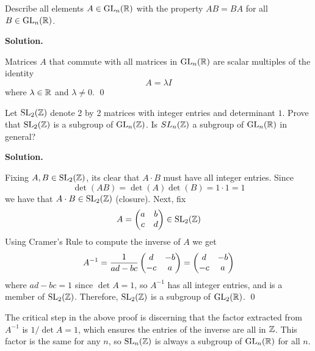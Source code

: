 \documentclass[12pt]{book}
\theoremstyle{definition}
\newenvironment{solution}
{%
  \par\noindent\textbf{Solution.}\quad
}
{%
  \qed\par
}
\begin{document}
\begin{taggedexercise}[\textcolor{yellow}{WIP}]
  Describe all elements $A \in \mathrm{GL}_{n}(\mathbb{R})$ with the property $AB=BA$ for all $B \in \mathrm{GL}_{n}(\mathbb{R})$.
\end{taggedexercise}

\begin{solution}
  Matrices $A$ that commute with all matrices in $\mathrm{GL}_{n}(\mathbb{R})$ are scalar multiples of the identity
  \[
  A = \lambda I
  \]
  where $\lambda \in \mathbb{R}$ and $\lambda \neq 0$.
\end{solution}

\begin{taggedexercise}[\textcolor{green}{Complete}]
  Let $\mathrm{SL}_{2}(\mathbb{Z})$ denote 2 by 2 matrices with integer entries and determinant $1$.
  Prove that $\mathrm{SL}_{2}(\mathbb{Z})$ is a subgroup of $\mathrm{GL}_{n}(\mathbb{Z})$. 
  Is $SL_n(\mathbb{Z})$ a subgroup of $\mathrm{GL}_{n}(\mathbb{R})$ in general?
\end{taggedexercise}

\begin{solution}
  Fixing $A, B \in \mathrm{SL}_{2}(\mathbb{Z})$, its clear that $A \cdot B$ must have all integer entries.
  Since
  \[
  \det(AB) = \det(A) \det(B) = 1 \cdot 1 = 1
  \]
  we have that $A \cdot B \in \mathrm{SL}_{2}(\mathbb{Z})$ (closure). 
  Next, fix
  \[
    A = \begin{pmatrix} a & b \\ c & d \end{pmatrix} \in \mathrm{SL}_{2}(\mathbb{Z})
  \]
  Using Cramer's Rule to compute the inverse of $A$ we get 
  \[
  A^{-1} = \frac{1}{ad-bc}\begin{pmatrix} d & -b \\ -c & a \end{pmatrix} = \begin{pmatrix} d & -b \\ -c & a \end{pmatrix} 
  \]
  where $ad-bc = 1$ since $\det A = 1$, so $A^{-1}$ has all integer entries, and is a member of $\mathrm{SL}_{2}(\mathbb{Z})$.
  Therefore, $\mathrm{SL}_{2}(\mathbb{Z})$ is a subgroup of $\mathrm{GL}_{2}(\mathbb{R})$.
\end{solution}

The critical step in the above proof is discerning that the factor extracted from $A^{-1}$ is $1/\det A = 1$, which ensures the entries of the inverse are all in $\mathbb{Z}$.
This factor is the same for any $n$, so $\mathrm{SL}_{n}(\mathbb{Z})$ is always a subgroup of $\mathrm{GL}_{n}(\mathbb{R})$ for all $n$.
\end{document}
